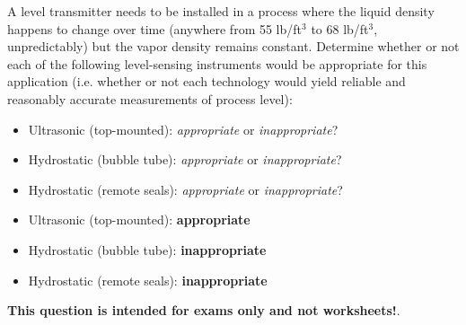 

A level transmitter needs to be installed in a process where the liquid density happens to change over time (anywhere from 55 lb/ft$^{3}$ to 68 lb/ft$^{3}$, unpredictably) but the vapor density remains constant.  Determine whether or not each of the following level-sensing instruments would be appropriate for this application (i.e. whether or not each technology would yield reliable and reasonably accurate measurements of process level):

\begin{itemize}
\item{} Ultrasonic (top-mounted): {\it appropriate} or {\it inappropriate}?
\vskip 10pt
\item{} Hydrostatic (bubble tube): {\it appropriate} or {\it inappropriate}?
\vskip 10pt
\item{} Hydrostatic (remote seals): {\it appropriate} or {\it inappropriate}?
\end{itemize}







\begin{itemize}
\item{} Ultrasonic (top-mounted): {\bf appropriate}
\vskip 10pt
\item{} Hydrostatic (bubble tube): {\bf inappropriate}
\vskip 10pt
\item{} Hydrostatic (remote seals): {\bf inappropriate}
\end{itemize}







{\bf This question is intended for exams only and not worksheets!}.



